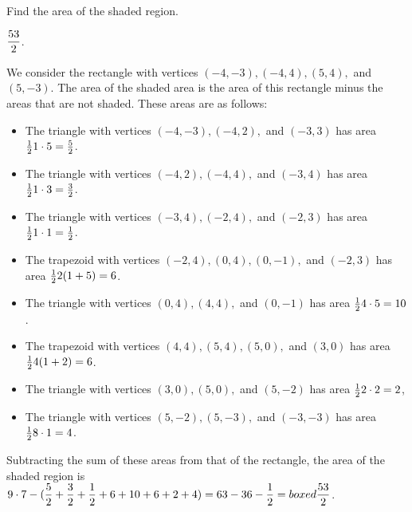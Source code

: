 \documentclass[11pt]{article}
\DeclareRobustCommand{\frac}[3][0pt]{%
  {\begingroup\hspace{#1}#2\hspace{#1}\endgroup\over\hspace{#1}#3\hspace{#1}}}
\begin{document}
\begin{problem}Find the area of the shaded region.
	\begin{center}
	\end{center}
\end{problem}

\answer $\displaystyle \frac{53}{2}$.
\begin{solution}
We consider the rectangle with vertices $(-4, -3), (-4, 4), (5, 4),$ and $(5, -3)$. The area of the shaded area is the area of this rectangle minus the areas that are not shaded. These areas are as follows:
\begin{itemize}
	\item The triangle with vertices $(-4, -3), (-4, 2),$ and $(-3, 3)$ has area $\frac{1}{2} 1 \cdot 5 = \frac{5}{2}$.
	\item The triangle with vertices $(-4, 2), (-4, 4),$ and $(-3, 4)$ has area $\frac{1}{2} 1 \cdot 3 = \frac{3}{2}$.
	\item The triangle with vertices $(-3, 4), (-2, 4),$ and $(-2, 3)$ has area $\frac{1}{2} 1 \cdot 1 = \frac{1}{2}$.
	\item The trapezoid with vertices $(-2, 4), (0, 4), (0, -1),$ and $(-2, 3)$ has area $\frac{1}{2} 2(1 + 5) = 6$.
	\item The triangle with vertices $(0, 4), (4, 4),$ and $(0, -1)$ has area $\frac{1}{2} 4 \cdot 5 = 10$.
	\item The trapezoid with vertices $(4, 4), (5, 4), (5, 0),$ and $(3, 0)$ has area $\frac{1}{2} 	4(1+2) = 6$.
	\item The triangle with vertices $(3, 0), (5, 0),$ and $(5, -2)$ has area $\frac{1}{2} 2 \cdot 2 = 2$,
	\item The triangle with vertices $(5, -2), (5, -3),$ and $(-3, -3)$ has area $\frac{1}{2} 8 \cdot 1 = 4$.
\end{itemize}
Subtracting the sum of these areas from that of the rectangle, the area of the shaded region is $\displaystyle 9 \cdot 7 - (\frac{5}{2} + \frac{3}{2} + \frac{1}{2} + 6 + 10 + 6 + 2 + 4) = 63 - 36 - \frac{1}{2} =boxed{\frac{53}{2}}$.
\end{solution}
\end{document}
